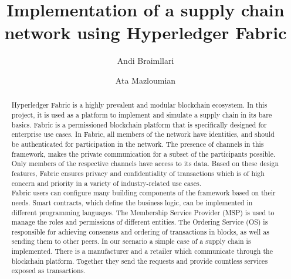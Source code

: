 \documentclass[sigconf,natbib=false]{acmart}
\begin{document}
    \title{Implementation of a supply chain network using Hyperledger Fabric}
    \pagestyle{plain} %

    \author{Andi Braimllari}

    \author{Ata Mazloumian}

    \begin{abstract}
        Hyperledger Fabric is a highly prevalent and modular blockchain ecosystem. In this project, it is used as a platform to implement and simulate a supply chain in its bare basics. Fabric is a permissioned blockchain platform that is specifically designed for enterprise use cases. In Fabric, all members of the network have identities, and should be authenticated for participation in the network. The presence of channels in this framework, makes the private communication for a subset of the participants possible. Only members of the respective channels have access to its data. Based on these design features, Fabric ensures privacy and confidentiality of transactions which is of high concern and priority in a variety of industry-related use cases.\\
        Fabric users can configure many building components of the framework based on their needs. Smart contracts, which define the business logic, can be implemented in different programming languages. The Membership Service Provider (MSP) is used to manage the roles and permissions of different entities. The Ordering Service (OS) is responsible for achieving consensus and ordering of transactions in blocks, as well as sending them to other peers.
        In our scenario a simple case of a supply chain is implemented. There is a manufacturer and a retailer which communicate through the blockchain platform. Together they send the requests and provide countless services exposed as transactions.
    \end{abstract}

\end{document}
